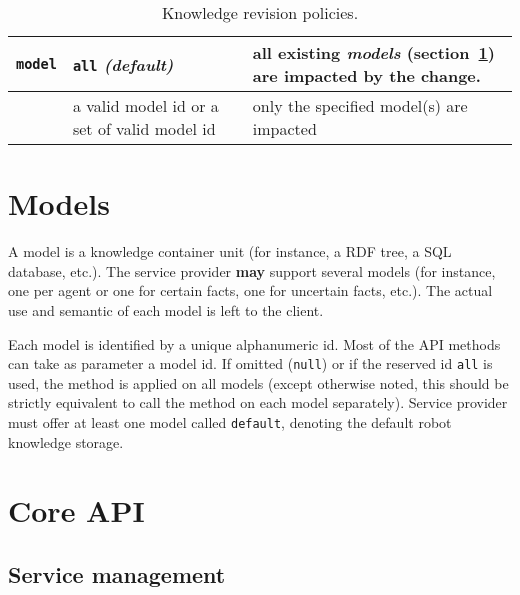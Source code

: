 \begin{table}
\begin{center}
\begin{tabular}{lp{4cm}p{9cm}}
    \midrule
    
    {\tt model} & {\tt all} \emph{(default)} & all existing \emph{models}
    (section~\ref{sect|kbapi-models}) are impacted by the change.\\

    \midrule
    
    & a valid model id or a set of valid model id & only the specified model(s)
    are impacted\\
    
    \bottomrule
    
    \end{tabular}

\end{center}
\caption{Knowledge revision policies.}
\label{table|knowledge-policies}
\end{table}


\section{Models}
\label{sect|kbapi-models}

A model is a knowledge container unit (for instance, a RDF tree, a SQL
database, etc.). The service provider \textbf{may} support several models
(for instance, one per agent or one for certain facts, one for uncertain facts,
etc.). The actual use and semantic of each model is left to the client.

Each model is identified by a unique alphanumeric id. Most of
the API methods can take as parameter a model id. If omitted ({\tt null}) or
if the reserved id {\tt all} is used, the method is applied on all models
(except otherwise noted, this should be strictly equivalent to call the method
on each model separately). Service provider must offer at least one model
called {\tt default}, denoting the default robot knowledge storage.


\section{Core API}

\subsection{Service management}

